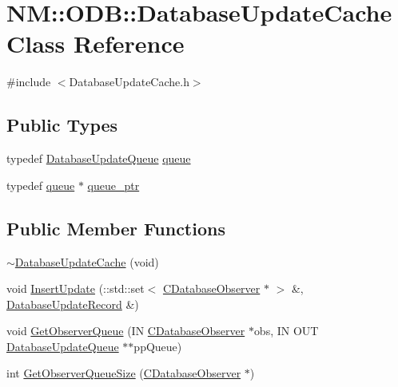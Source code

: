 \hypertarget{class_n_m_1_1_o_d_b_1_1_database_update_cache}{}\section{N\+M\+:\+:O\+D\+B\+:\+:Database\+Update\+Cache Class Reference}
\label{class_n_m_1_1_o_d_b_1_1_database_update_cache}


{\ttfamily \#include $<$Database\+Update\+Cache.\+h$>$}

\subsection*{Public Types}
\begin{DoxyCompactItemize}
\item 
typedef \hyperlink{class_n_m_1_1_o_d_b_1_1_database_update_queue}{Database\+Update\+Queue} \hyperlink{class_n_m_1_1_o_d_b_1_1_database_update_cache_a3276437d24ef54dd3d31e2c27f34e84a}{queue}
\item 
typedef \hyperlink{class_n_m_1_1_o_d_b_1_1_database_update_cache_a3276437d24ef54dd3d31e2c27f34e84a}{queue} $\ast$ \hyperlink{class_n_m_1_1_o_d_b_1_1_database_update_cache_ae031bccefd897ef3c1d44a4e6c7ca99c}{queue\+\_\+ptr}
\end{DoxyCompactItemize}
\subsection*{Public Member Functions}
\begin{DoxyCompactItemize}
\item 
\hyperlink{class_n_m_1_1_o_d_b_1_1_database_update_cache_af064cf7160af5df46ebdd80d3df71434}{$\sim$\+Database\+Update\+Cache} (void)
\item 
void \hyperlink{class_n_m_1_1_o_d_b_1_1_database_update_cache_a2e906ecc8b45275c3f810afe40657a0f}{Insert\+Update} (\+::std\+::set$<$ \hyperlink{class_n_m_1_1_o_d_b_1_1_c_database_observer}{C\+Database\+Observer} $\ast$ $>$ \&, \hyperlink{class_n_m_1_1_o_d_b_1_1_database_update_record}{Database\+Update\+Record} \&)
\item 
void \hyperlink{class_n_m_1_1_o_d_b_1_1_database_update_cache_a69668e83a0c3ca8e6b9cdf9cc2e20a83}{Get\+Observer\+Queue} (I\+N \hyperlink{class_n_m_1_1_o_d_b_1_1_c_database_observer}{C\+Database\+Observer} $\ast$obs, I\+N O\+U\+T \hyperlink{class_n_m_1_1_o_d_b_1_1_database_update_queue}{Database\+Update\+Queue} $\ast$$\ast$pp\+Queue)
\item 
int \hyperlink{class_n_m_1_1_o_d_b_1_1_database_update_cache_af316bb9d19bcec424929e70f79ac81f1}{Get\+Observer\+Queue\+Size} (\hyperlink{class_n_m_1_1_o_d_b_1_1_c_database_observer}{C\+Database\+Observer} $\ast$)
\end{DoxyCompactItemize}

